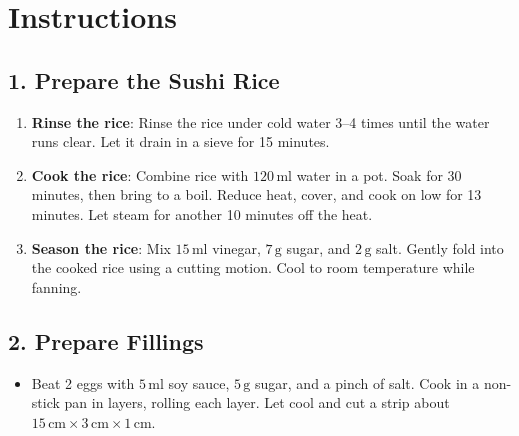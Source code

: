 \documentclass[landscape, a4paper]{article}
\newcommand\alert[1]{\textcolor{PrimaryColor}{\textbf{#1}}}
\begin{document}
\hfill%
\vrule width 0.01cm
\hfill%
\begin{minipage}[t]{0.31\textwidth}
	\vspace{0cm}
	\setlength{\parskip}{0.25cm}

	\section*{Instructions}
	\vspace{0.25cm}

	\subsection*{1. Prepare the Sushi Rice}
	\vspace{0.25cm}
	\begin{enumerate}
		\item \alert{Rinse the rice}: Rinse the rice under cold water 3--4 times until the water runs clear. Let it drain in a sieve for 15 minutes.
		\item \alert{Cook the rice}: Combine rice with \(120\,\mathrm{ml}\) water in a pot. Soak for 30 minutes, then bring to a boil. Reduce heat, cover, and cook on low for 13 minutes. Let steam for another 10 minutes off the heat.
		\item \alert{Season the rice}: Mix \(15\,\mathrm{ml}\) vinegar, \(7\,\mathrm{g}\) sugar, and \(2\,\mathrm{g}\) salt. Gently fold into the cooked rice using a cutting motion. Cool to room temperature while fanning.
	\end{enumerate}

	\subsection*{2. Prepare Fillings}
	\begin{itemize}
		\item Beat 2 eggs with \(5\,\mathrm{ml}\) soy sauce, \(5\,\mathrm{g}\) sugar, and a pinch of salt. Cook in a non-stick pan in layers, rolling each layer. Let cool and cut a strip about \(15\,\mathrm{cm} \times 3\,\mathrm{cm} \times 1\,\mathrm{cm}\).

	\end{itemize}


\end{minipage}
\end{document}
